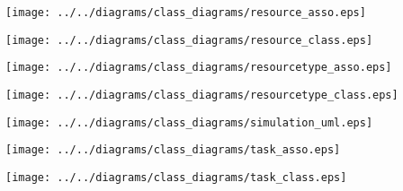     \begin{frame}
    \begin{center}
    \texttt{[image: ../../diagrams/class\_diagrams/resource\_asso.eps]}
    \end{center}
    \end{frame}
    

    \begin{frame}
    \begin{center}
    \texttt{[image: ../../diagrams/class\_diagrams/resource\_class.eps]}
    \end{center}
    \end{frame}
    

    \begin{frame}
    \begin{center}
    \texttt{[image: ../../diagrams/class\_diagrams/resourcetype\_asso.eps]}
    \end{center}
    \end{frame}
    

    \begin{frame}
    \begin{center}
    \texttt{[image: ../../diagrams/class\_diagrams/resourcetype\_class.eps]}
    \end{center}
    \end{frame}
    

    \begin{frame}
    \begin{center}
    \texttt{[image: ../../diagrams/class\_diagrams/simulation\_uml.eps]}
    \end{center}
    \end{frame}
    

    \begin{frame}
    \begin{center}
    \texttt{[image: ../../diagrams/class\_diagrams/task\_asso.eps]}
    \end{center}
    \end{frame}
    

    \begin{frame}
    \begin{center}
    \texttt{[image: ../../diagrams/class\_diagrams/task\_class.eps]}
    \end{center}
    \end{frame}
    

